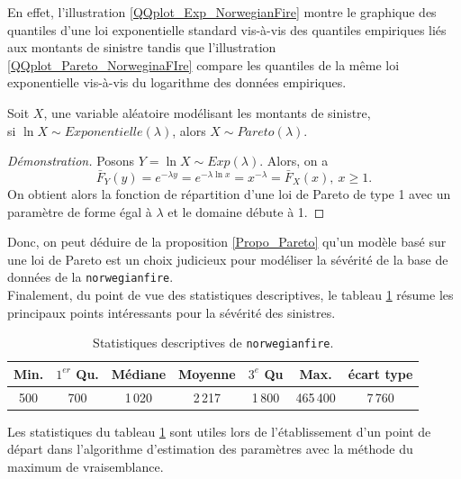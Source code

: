			En effet, l'illustration \ref{QQplot_Exp_NorwegianFire} montre le graphique des quantiles d'une loi exponentielle standard vis-à-vis des quantiles empiriques liés aux montants de sinistre tandis que l'illustration \ref{QQplot_Pareto_NorweginaFIre} compare les quantiles de la même loi exponentielle vis-à-vis du logarithme des données empiriques. 
			
			\begin{Proposition}\label{Propo_Pareto}
				Soit $X$, une variable aléatoire modélisant les montants de sinistre, \\si $\ln X \sim Exponentielle(\lambda)$, alors $X\sim Pareto(\lambda)$.
			\end{Proposition}
			
			\begin{proof}[Démonstration]
				Posons $Y=\ln X \sim Exp(\lambda)$. Alors, on a 
				$$
				\bar{F}_Y(y) = e^{-\lambda y} = e^{-\lambda \ln x} = x^{-\lambda} = \bar{F}_X(x),\: x\geq 1.
				$$
				On obtient alors la fonction de répartition d'une loi de Pareto de type 1 avec un paramètre de forme égal à $\lambda$ et le domaine débute à 1.
			\end{proof}

			Donc, on peut déduire de la proposition \ref{Propo_Pareto} qu'un modèle basé sur une loi de Pareto est un choix judicieux pour modéliser la sévérité de la base de données de la \texttt{norwegianfire}.\\
			
			Finalement, du point de vue des statistiques descriptives, le tableau \ref{Stats_Norwegianfire} résume les principaux points intéressants pour la sévérité des sinistres.
			
			\begin{table}[H]
				\begin{center}
				\begin{tabular}{ccccccc}
					Min.& $1^{er}$ Qu.	&	Médiane	&	Moyenne	&	$3^e$ Qu	&	Max.	&	écart type \\
					\hline
					500	&	700			&	1\,020	&	2\,217	&	1\,800		&	465\,400	&	7\,760
				\end{tabular}
				\renewcommand{\tablename}{Tableau}
				\caption{Statistiques descriptives de \texttt{norwegianfire}.}\label{Stats_Norwegianfire}
				\end{center}
			\end{table}
		
			Les statistiques du tableau \ref{Stats_Norwegianfire} sont utiles lors de l'établissement d'un point de départ dans l'algorithme d'estimation des paramètres avec la méthode du maximum de vraisemblance.
			
